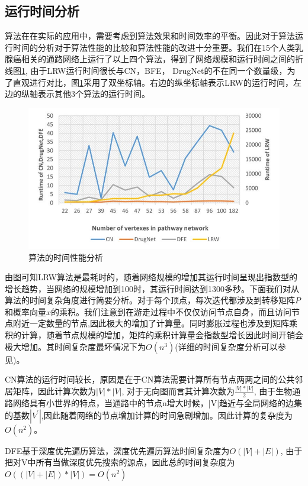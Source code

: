 \subsection{运行时间分析}
算法在在实际的应用中，需要考虑到算法效果和时间效率的平衡。因此对于算法运行时间的分析对于算法性能的比较和算法性能的改进十分重要。我们在15个人类乳腺癌相关的通路网络上运行了以上四个算法，得到了网络规模和运行时间之间的折线图\ref{runtime}, 由于LRW运行时间很长与CN，BFE， DrugNet的不在同一个数量级，为了直观进行对比，图\ref{runtime}采用了双坐标轴。右边的纵坐标轴表示LRW的运行时间，左边的纵轴表示其他3个算法的运行时间。
\begin{figure}[h]
\centering
\includegraphics[width = 1.0\textwidth]{runtime}
\caption[runtime]{算法的时间性能分析}
\label{runtime}
\end{figure}

由图可知LRW算法是最耗时的，随着网络规模的增加其运行时间呈现出指数型的增长趋势，当网络的规模增加到100时，其运行时间达到1300多秒。下面我们对从算法的时间复杂角度进行简要分析。对于每个顶点，每次迭代都涉及到转移矩阵$P$和概率向量$x$的乘积。我们注意到在游走过程中不仅仅访问节点自身，而且访问节点附近一定数量的节点,因此极大的增加了计算量。同时膨胀过程也涉及到矩阵乘积的计算，随着节点规模的增加，矩阵的乘积计算量会指数型增长因此时间开销会极大增加。其时间复杂度最坏情况下为$O(n^{3})$(详细的时间复杂度分析可以参见\cite{})。

CN算法的运行时间较长，原因是在于CN算法需要计算所有节点两两之间的公共邻居矩阵，因此计算次数为$|V|*|V|$, 对于无向图而言其计算次数为$\frac{|V|*|V|}{2}$, 由于生物通路网络具有小世界的特点，当通路中的节点n增大时候，|V|趋近与全局网络的边集的基数$|V^{'}|$,因此随着网络的节点增加计算的时间急剧增加。因此计算的复杂度为$O(n^{2})$。

DFE基于深度优先遍历算法，深度优先遍历算法时间复杂度为$O(|V| + |E|)$, 由于把对V中所有当做深度优先搜索的源点，因此总的时间复杂度为$O((|V| + |E|)*|V|)=O(n^{2})$

